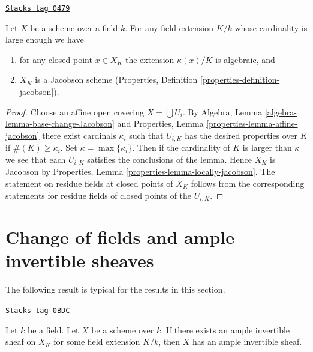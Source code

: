 \begin{lemma}
\label{varieties-lemma-make-Jacobson}
\href{https://stacks.math.columbia.edu/tag/0479}{\texttt{Stacks tag 0479}}

Let $X$ be a scheme over a field $k$.
For any field extension $K/k$ whose cardinality is large enough
we have
\begin{enumerate}
\item for any closed point $x \in X_K$ the extension $\kappa(x)/K$
is algebraic, and
\item $X_K$ is a Jacobson scheme
(Properties, Definition \ref{properties-definition-jacobson}).
\end{enumerate}
\end{lemma}

\begin{proof}
Choose an affine open covering $X = \bigcup U_i$.
By
Algebra, Lemma \ref{algebra-lemma-base-change-Jacobson}
and
Properties, Lemma \ref{properties-lemma-affine-jacobson}
there exist cardinals $\kappa_i$ such that $U_{i, K}$ has
the desired properties over $K$ if $\#(K) \geq \kappa_i$.
Set $\kappa = \max\{\kappa_i\}$. Then if the cardinality of
$K$ is larger than $\kappa$ we see that each $U_{i, K}$ satisfies
the conclusions of the lemma. Hence $X_K$ is Jacobson by
Properties, Lemma \ref{properties-lemma-locally-jacobson}.
The statement on residue fields at closed points of $X_K$
follows from the corresponding
statements for residue fields of closed points of the $U_{i, K}$.
\end{proof}

\section{Change of fields and ample invertible sheaves}
\label{varieties-section-change-fields-ample}
The following result is typical for the results in this section.

\begin{lemma}
\label{varieties-lemma-ample-after-field-extension}
\href{https://stacks.math.columbia.edu/tag/0BDC}{\texttt{Stacks tag 0BDC}}

Let $k$ be a field. Let $X$ be a scheme over $k$.
If there exists an ample invertible sheaf on $X_K$ for some
field extension $K/k$, then $X$ has an ample invertible
sheaf.
\end{lemma}

